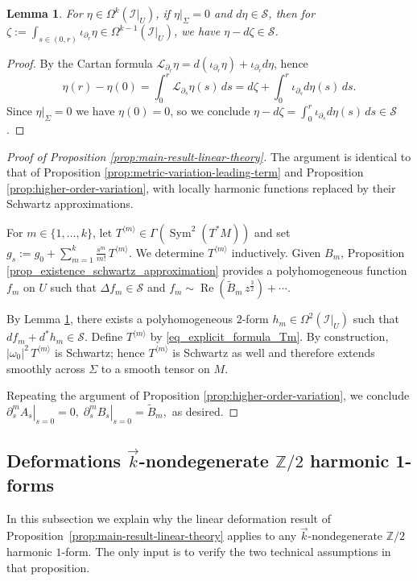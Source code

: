 \documentclass[11pt]{amsart}
\newcommand{\ZT}{\mathbb{Z}/2}
\newcommand{\Sym}{\operatorname{Sym}}
\newcommand{\del}{\partial}
\renewcommand{\Re}{\operatorname{Re}}
\newcommand{\MS}{\mathcal{S}}
\newtheorem{lemma}[theorem]{Lemma}
\newcommand{\MI}{\mathcal{I}}
\begin{document}
\begin{lemma}
	\label{lem:Z2-equivariant-Schwartz-forms-are-approximately-exact}
For $\eta\in \Omega^k(\MI|_U)$, if $\eta|_{\Sigma}=0$ and $d\eta\in \MS$, then for $\zeta := \int_{s \in (0,r)} \iota_{\del_r } \eta\in \Omega^{k-1}(\MI|_U)$, we have $\eta-d\zeta \in\MS$.	
\end{lemma}
\begin{proof}
	By the Cartan formula $\mathcal L_{\partial_r}\eta=d(\iota_{\partial_r}\eta)+\iota_{\partial_r}d\eta$, hence
	$$\eta(r)-\eta(0)=\int_0^r\mathcal L_{\partial_s}\eta(s)\,ds
	=d\zeta+\int_0^r \iota_{\partial_s}d\eta(s)\,ds.$$
	Since $\eta|_{\Sigma}=0$ we have $\eta(0)=0$, so we conclude
	$\eta-d\zeta=\int_0^r \iota_{\partial_s}d\eta(s)\,ds\in\MS$.
\end{proof}
\begin{proof}[Proof of Proposition \ref{prop:main-result-linear-theory}]
	The argument is identical to that of Proposition \ref{prop:metric-variation-leading-term} and
	Proposition \ref{prop:higher-order-variation}, with locally harmonic functions replaced by their
	Schwartz approximations. 
	
	For $m\in\{1,\ldots,k\}$, let $T^{\langle m\rangle}\in \Gamma(\Sym^2(T^*M))$ and set $g_s:=g_0+\sum_{m=1}^k \frac{s^m}{m!}\,T^{\langle m\rangle}.$ We determine $T^{\langle m\rangle}$ inductively. Given $B_m$, Proposition \ref{prop_existence_schwartz_approximation} provides a polyhomogeneous
	function $f_m$ on $U$ such that $\Delta f_m\in \MS$ and $f_m\sim \Re(\widetilde B_m \,z^{\frac32})+\cdots .$
	
	By Lemma \ref{lem:Z2-equivariant-Schwartz-forms-are-approximately-exact}, there exists a
	polyhomogeneous $2$-form $h_m\in \Omega^2(\MI|_U)$ such that $df_m+d^*h_m\in \MS$.
	Define $T^{\langle m\rangle}$ by \eqref{eq_explicit_formula_Tm}. By construction,
	$|\omega_0|^2\,T^{\langle m\rangle}$ is Schwartz; hence $T^{\langle m\rangle}$ is Schwartz as well and
	therefore extends smoothly across $\Sigma$ to a smooth tensor on $M$.
	
	Repeating the argument of Proposition \ref{prop:higher-order-variation}, we conclude $\left.\partial_s^m A_s\right|_{s=0}=0,\;
	\left.\partial_s^m B_s\right|_{s=0}=\widetilde{B}_m,$ as desired.
\end{proof}

\subsection{Deformations \texorpdfstring{$\vec{k}$}
{k}-nondegenerate \texorpdfstring{$\ZT$}{Z/2} harmonic 1-forms}
In this subsection we explain why the linear deformation result of
Proposition~\ref{prop:main-result-linear-theory} applies to any $\vec{k}$-nondegenerate
$\ZT$ harmonic $1$-form.  The only input is to verify the two technical assumptions in that proposition.
\end{document}
